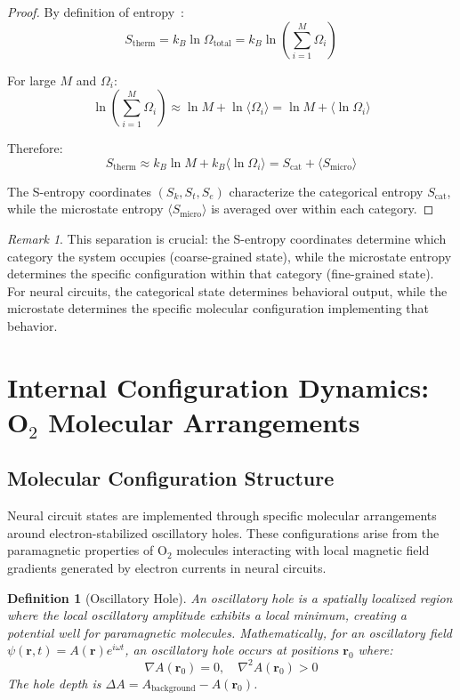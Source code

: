 \documentclass[aps,prd,twocolumn,superscriptaddress,floatfix,nofootinbib]{revtex4-2}
\newtheorem{definition}[theorem]{Definition}
\theoremstyle{remark}
\newtheorem{remark}[theorem]{Remark}
\begin{document}
\begin{proof}
By definition of entropy~\cite{callen1985thermodynamics}:
$$
S_{\text{therm}} = k_B \ln \Omega_{\text{total}} = k_B \ln \left(\sum_{i=1}^M \Omega_i\right)
$$

For large $M$ and $\Omega_i$:
$$
\ln \left(\sum_{i=1}^M \Omega_i\right) \approx \ln M + \ln \langle \Omega_i \rangle = \ln M + \langle \ln \Omega_i \rangle
$$

Therefore:
$$
S_{\text{therm}} \approx k_B \ln M + k_B \langle \ln \Omega_i \rangle = S_{\text{cat}} + \langle S_{\text{micro}} \rangle
$$

The S-entropy coordinates $(S_k, S_t, S_e)$ characterize the categorical entropy $S_{\text{cat}}$, while the microstate entropy $\langle S_{\text{micro}} \rangle$ is averaged over within each category.
\end{proof}

\begin{remark}
This separation is crucial: the S-entropy coordinates determine which category the system occupies (coarse-grained state), while the microstate entropy determines the specific configuration within that category (fine-grained state). For neural circuits, the categorical state determines behavioral output, while the microstate determines the specific molecular configuration implementing that behavior.
\end{remark}

\section{Internal Configuration Dynamics: O$_2$ Molecular Arrangements}
\label{sec:thought}

\subsection{Molecular Configuration Structure}

Neural circuit states are implemented through specific molecular arrangements around electron-stabilized oscillatory holes. These configurations arise from the paramagnetic properties of O$_2$ molecules interacting with local magnetic field gradients generated by electron currents in neural circuits.

\begin{definition}[Oscillatory Hole]
\label{def:osc_hole}
An oscillatory hole is a spatially localized region where the local oscillatory amplitude exhibits a local minimum, creating a potential well for paramagnetic molecules. Mathematically, for an oscillatory field $\psi(\mathbf{r}, t) = A(\mathbf{r}) e^{i\omega t}$, an oscillatory hole occurs at positions $\mathbf{r}_0$ where:
$$
\nabla A(\mathbf{r}_0) = 0, \quad \nabla^2 A(\mathbf{r}_0) > 0
$$
The hole depth is $\Delta A = A_{\text{background}} - A(\mathbf{r}_0)$.
\end{definition}
\end{document}
